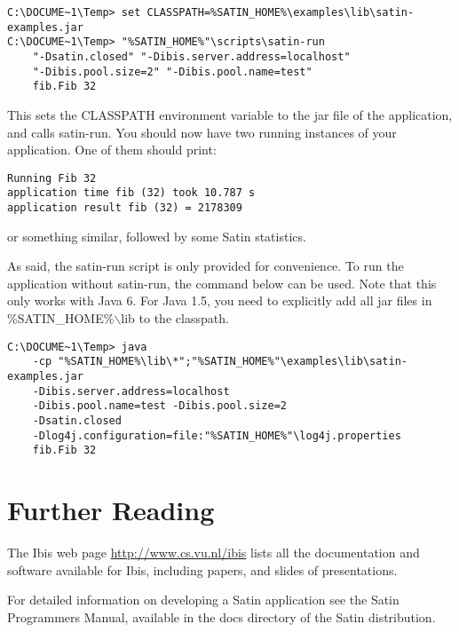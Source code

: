 \documentclass[a4paper,10pt]{article}
\begin{document}
\noindent
{\small
\begin{verbatim}
C:\DOCUME~1\Temp> set CLASSPATH=%SATIN_HOME%\examples\lib\satin-examples.jar
C:\DOCUME~1\Temp> "%SATIN_HOME%"\scripts\satin-run
    "-Dsatin.closed" "-Dibis.server.address=localhost"
    "-Dibis.pool.size=2" "-Dibis.pool.name=test"
    fib.Fib 32
\end{verbatim}
}
\noindent

This sets the CLASSPATH environment variable to the jar file of the
application, and calls satin-run. You should now have two running
instances of your application. One of them should print:

\noindent
{\small
\begin{verbatim}
Running Fib 32
application time fib (32) took 10.787 s
application result fib (32) = 2178309
\end{verbatim}
}
\noindent

or something similar, followed by some Satin statistics.

As said, the satin-run script is only provided for convenience. To run
the application without satin-run, the command below can be used.
Note that this only works with Java 6. For Java 1.5, you need to
explicitly add all jar files in \%SATIN\_HOME\%$\backslash$lib to the classpath.

\noindent
{\small
\begin{verbatim}
C:\DOCUME~1\Temp> java
    -cp "%SATIN_HOME%\lib\*";"%SATIN_HOME%"\examples\lib\satin-examples.jar
    -Dibis.server.address=localhost
    -Dibis.pool.name=test -Dibis.pool.size=2
    -Dsatin.closed
    -Dlog4j.configuration=file:"%SATIN_HOME%"\log4j.properties
    fib.Fib 32
\end{verbatim}
}
\noindent

\section{Further Reading}

The Ibis web page \url{http://www.cs.vu.nl/ibis} lists all
the documentation and software available for Ibis, including papers, and
slides of presentations.

For detailed information on developing a Satin application see the
Satin Programmers Manual, available in the docs directory of the Satin
distribution.
\end{document}

